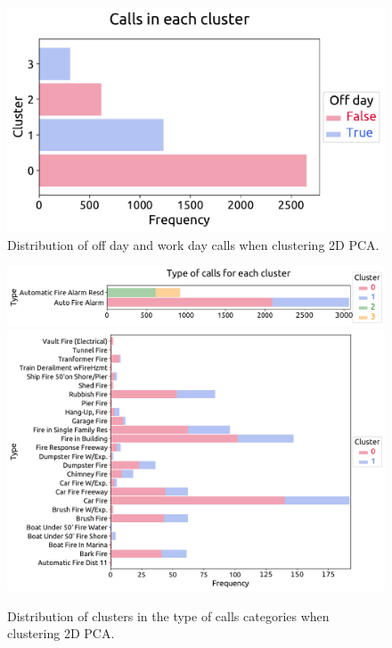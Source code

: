 \documentclass[12pt,a4paper]{article}
\begin{document}
\begin{figure}[ht!]
\centering
\includegraphics[scale=0.6]{figs/STORY_2D_PCA_off_days.pdf}
\caption{Distribution of off day and work day calls when clustering 2D PCA.}
\label{STORY_2D_PCA_off_days}
\end{figure}

\begin{figure}[ht!]
\centering
\includegraphics[scale=0.52]{figs/STORY_2D_PCA_type_1.pdf}
\includegraphics[scale=0.52]{figs/STORY_2D_PCA_type_2.pdf}
\caption{Distribution of clusters in the type of calls categories when clustering 2D PCA.}
\label{STORY_2D_PCA_type}
\end{figure}
\end{document}
